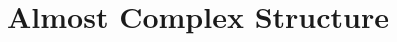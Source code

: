 \documentclass[Total.tex]{subfiles}
\begin{document}
	\chapter{Almost Complex Structure}
\end{document}
